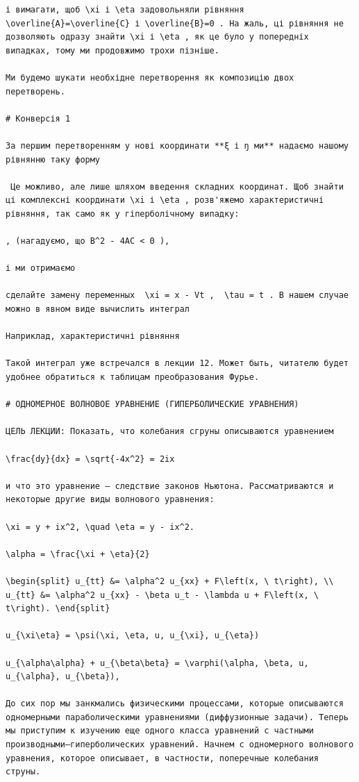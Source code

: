 \documentclass[
  ukrainian,
]{article}
\begin{document}
\begin{verbatim}
і вимагати, щоб \xi і \eta задовольняли рівняння \overline{A}=\overline{C} і \overline{B}=0 . На жаль, ці рівняння не дозволяють одразу знайти \xi і \eta , як це було у попередніх випадках, тому ми продовжимо трохи пізніше.

Ми будемо шукати необхідне перетворення як композицію двох перетворень.

# Конверсія 1

За першим перетворенням у нові координати **ξ і ŋ ми** надаємо нашому рівнянню таку форму

 Це можливо, але лише шляхом введення складних координат. Щоб знайти ці комплексні координати \xi і \eta , розв'яжемо характеристичні рівняння, так само як у гіперболічному випадку:

, (нагадуємо, що B^2 - 4AC < 0 ),

і ми отримаємо

сделайте замену переменных  \xi = x - Vt ,  \tau = t . В нашем случае можно в явном виде вычислить интеграл

Наприклад, характеристичні рівняння

Такой интеграл уже встречался в лекции 12. Может быть, читателю будет удобнее обратиться к таблицам преобразования Фурье.

# ОДНОМЕРНОЕ ВОЛНОВОЕ УРАВНЕНИЕ (ГИПЕРБОЛИЧЕСКИЕ УРАВНЕНИЯ)

ЦЕЛЬ ЛЕКЦИИ: Показать, что колебания сгруны описываются уравнением

\frac{dy}{dx} = \sqrt{-4x^2} = 2ix

и что это уравнение — следствие законов Ньютона. Рассматриваются и некоторые другие виды волнового уравнения:

\xi = y + ix^2, \quad \eta = y - ix^2.

\alpha = \frac{\xi + \eta}{2}

\begin{split} u_{tt} &= \alpha^2 u_{xx} + F\left(x, \ t\right), \\ u_{tt} &= \alpha^2 u_{xx} - \beta u_t - \lambda u + F\left(x, \ t\right). \end{split}

u_{\xi\eta} = \psi(\xi, \eta, u, u_{\xi}, u_{\eta})

u_{\alpha\alpha} + u_{\beta\beta} = \varphi(\alpha, \beta, u, u_{\alpha}, u_{\beta}),

До сих пор мы занкмались физическими процессами, которые описываются одномерными параболическими уравнениями (диффузионные задачи). Теперь мы приступим к изучению еще одного класса уравнений с частными производными—гиперболических уравнений. Начнем с одномерного волнового уравнения, которое описывает, в частности, поперечные колебания струны.


\end{verbatim}
\end{document}

